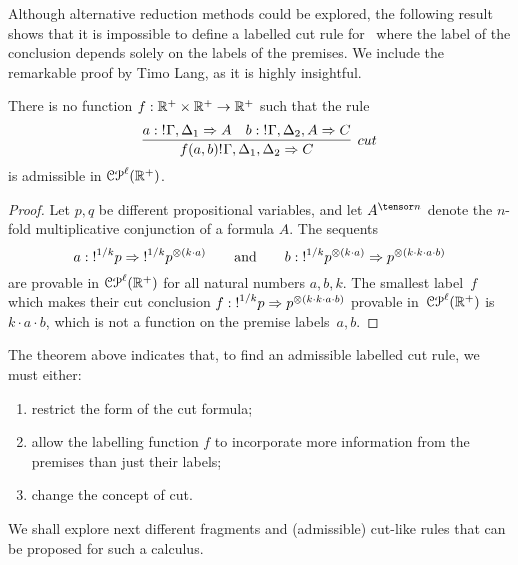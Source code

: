 Although alternative reduction methods could be explored, the following result shows that it is impossible to define a labelled cut rule for \laSELLR\ where the label of the conclusion depends solely on the labels of the premises. We include the remarkable proof by Timo Lang, as it is highly insightful.
\begin{theorem}\label{thm:impossible} There is no function $f:\mathbb{R}^+\times \mathbb{R}^+\rightarrow\mathbb{R}^+$ such that the rule
$$
\infer[cut]{f(a,b)\nbang{}\Gamma,\Delta_1,\Delta_2\seq C}
	{a: \nbang{}\Gamma,\Delta_1\seq A &
	b:\nbang{}\Gamma,\Delta_2,A\seq C
	}
$$
is admissible in $\mathcal{CP}^\ell(\mathbb{R}^{+})$.
\end{theorem}
\begin{proof}
Let $p,q$ be different propositional variables, and let $A^{\tensor n}$ denote the $n$-fold multiplicative conjunction of a formula $A$. The sequents
$$a:\hbox{$\mathop{!}^{1/k}$}p\Rightarrow\hbox{$\mathop{!}^{1/k}$}p^{\otimes (k\cdot a)}\qquad\text{and}\qquad b:\hbox{$\mathop{!}^{1/k}$}p^{\otimes (k\cdot a)}\Rightarrow p^{\otimes(k\cdot k\cdot a\cdot b)} 
$$
are provable in $\mathcal{CP}^\ell(\mathbb{R}^{+})$ for all natural numbers $a,b,k$. The smallest label~$f$ which makes their cut conclusion
$f: \hbox{$\mathop{!}^{1/k}$}p\Rightarrow p^{\otimes(k\cdot k\cdot a\cdot b)}
$ 
provable in~$\mathcal{CP}^\ell(\mathbb{R}^{+})$ is~$k\cdot a\cdot b$, which is not a function on the premise labels~$a,b$.
\end{proof}

\noindent

The theorem above indicates that, to find an admissible labelled cut rule, we must either:
\begin{enumerate}
\item restrict the form of the cut formula;
\item allow the labelling function $f$ to incorporate more information from the premises than just their labels;
\item change the concept of cut.  
\end{enumerate}



We shall explore next
different fragments and (admissible) cut-like rules that can be proposed for such a calculus. 
